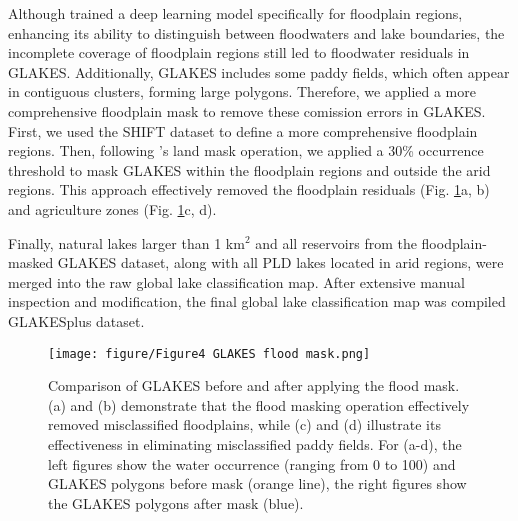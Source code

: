 \documentclass[preprint,12pt,authoryear]{elsarticle}
\begin{document}
Although \citet{pi_mapping_2022} trained a deep learning model specifically  for floodplain regions, enhancing its ability to distinguish between floodwaters and lake boundaries, the incomplete coverage of floodplain regions still led to floodwater residuals in GLAKES. Additionally, GLAKES includes some paddy fields, which often appear in contiguous clusters, forming large polygons. Therefore, we applied a more comprehensive floodplain mask to remove these comission errors in GLAKES. First, we used the SHIFT \citep{zheng_shift_2024} dataset to define a more comprehensive floodplain regions. Then, following \citet{pi_mapping_2022}'s land mask operation, we applied a 30\% occurrence threshold to mask GLAKES within the floodplain regions and outside the arid regions. This approach effectively removed the floodplain residuals (Fig. \ref{fig:Fig4}a, b) and agriculture zones (Fig. \ref{fig:Fig4}c, d). 

Finally, natural lakes larger than 1 km$^2$ and all reservoirs from the floodplain-masked GLAKES dataset, along with all PLD lakes located in arid regions, were merged into the raw global lake classification map. After extensive manual inspection and modification, the final global lake classification map was compiled GLAKESplus dataset.
\begin{figure}[h]
    \centering
    \texttt{[image: figure/Figure4 GLAKES flood mask.png]}
    \caption{Comparison of GLAKES before and after applying the flood mask. (a) and (b) demonstrate that the flood masking operation effectively removed misclassified floodplains, while (c) and (d) illustrate its effectiveness in eliminating misclassified paddy fields. For (a-d), the left figures show the water occurrence (ranging from 0 to 100) and GLAKES polygons before mask (orange line), the right figures show the GLAKES polygons after mask (blue).}
    \label{fig:Fig4}
\end{figure}
\end{document}
